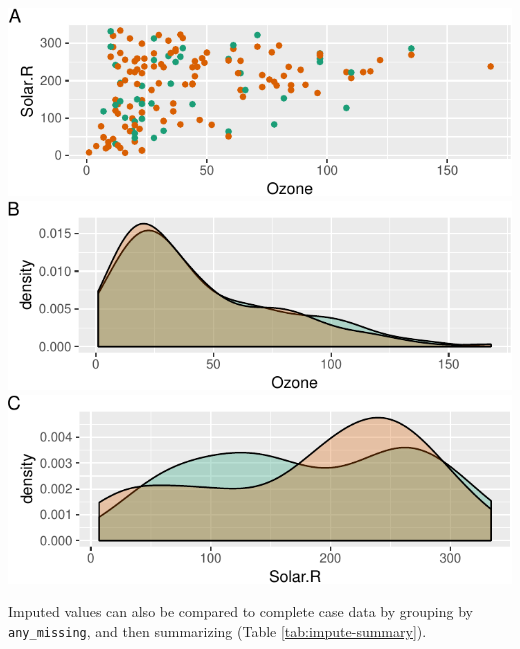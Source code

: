 \documentclass[]{article}
\let\origfigure\figure
\let\endorigfigure\endfigure
\renewenvironment{figure}[1][2] {
    \expandafter\origfigure\expandafter[H]
} {
    \endorigfigure
}
\theoremstyle{definition}
\theoremstyle{definition}
\theoremstyle{definition}
\theoremstyle{remark}
\begin{document}
\begin{figure}

{\centering \includegraphics[width=1\linewidth]{tidy-missing-data-paper_files/figure-latex/track-impute-example-1} \includegraphics[width=1\linewidth]{tidy-missing-data-paper_files/figure-latex/track-impute-example-2} \includegraphics[width=1\linewidth]{tidy-missing-data-paper_files/figure-latex/track-impute-example-3} 

}

\caption{Scatterplot (A) and density plots (B and C) of ozone and solar radiation from the airquality dataset containing imputed values imputed using simputations `impute\_knn` function, with imputed values colored green and data values orange. Imputed values are similar, but slightly different to existing data.}\label{fig:track-impute-example}
\end{figure}

Imputed values can also be compared to complete case data by grouping by
\texttt{any\_missing}, and then summarizing (Table
\ref{tab:impute-summary}).
\end{document}
